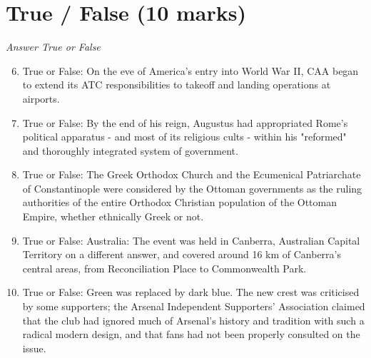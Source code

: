 \documentclass[12pt]{article}
\begin{document}
\section*{True / False (10 marks)}
\textit{Answer True or False}
\begin{enumerate}[label=\arabic*.]
\setcounter{enumi}{5}
\item True or False: On the eve of America's entry into World War II, CAA began to extend its ATC responsibilities to takeoff and landing operations at airports.
\item True or False: By the end of his reign, Augustus had appropriated Rome's political apparatus - and most of its religious cults - within his "reformed" and thoroughly integrated system of government.
\item True or False: The Greek Orthodox Church and the Ecumenical Patriarchate of Constantinople were considered by the Ottoman governments as the ruling authorities of the entire Orthodox Christian population of the Ottoman Empire, whether ethnically Greek or not.
\item True or False: Australia: The event was held in Canberra, Australian Capital Territory on a different answer, and covered around 16 km of Canberra's central areas, from Reconciliation Place to Commonwealth Park.
\item True or False: Green was replaced by dark blue. The new crest was criticised by some supporters; the Arsenal Independent Supporters' Association claimed that the club had ignored much of Arsenal's history and tradition with such a radical modern design, and that fans had not been properly consulted on the issue.
\end{enumerate}
\end{document}
